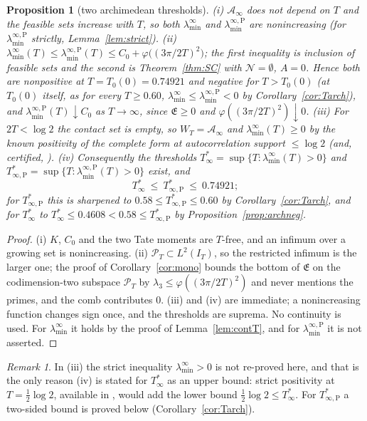 \documentclass[11pt]{amsart}
\newtheorem{proposition}[theorem]{Proposition}
\theoremstyle{definition}
\theoremstyle{remark}
\newtheorem{remark}[theorem]{Remark}
\newcommand{\PT}{\mathcal P_T}
\newcommand{\IT}{I_T}
\newcommand{\Lev}{\mathfrak E}
\newcommand{\Ainf}{\mathcal A_\infty}
\newcommand{\laminf}{\lambda^{\infty}_{\min}}
\newcommand{\laminfP}{\lambda^{\infty,\mathrm P}_{\min}}
\begin{document}
\begin{proposition}[two archimedean thresholds]\label{prop:arch}
\emph{(i)} $\Ainf$ does not depend on $T$ and the feasible sets increase with $T$, so both
$\laminf$ and $\laminfP$ are nonincreasing (for $\laminfP$ strictly, Lemma~\ref{lem:strict}).
\emph{(ii)} $\laminf(T)\le\laminfP(T)\le C_0+\varphi\big((3\pi/2T)^2\big)$; the first inequality is
inclusion of feasible sets and the second is Theorem~\ref{thm:SC} with $\mathcal N=\emptyset$,
$A=0$. Hence both are nonpositive at $T=T_0(0)=0.74921$ and negative for $T>T_0(0)$ (at $T_0(0)$
itself, as for every $T\ge0.60$, $\laminf\le\laminfP<0$ by Corollary~\ref{cor:Tarch}), and $\laminfP(T)\downarrow C_0$ as
$T\to\infty$, since $\Lev\ge0$ and $\varphi((3\pi/2T)^2)\downarrow0$.
\emph{(iii)} For $2T<\log2$ the contact set is empty, so $W_T=\Ainf$ and $\laminf(T)\ge0$ by the
known positivity of the complete form at autocorrelation support $\le\log2$
\textup{\cite{Yoshida1992,Bombieri2000}} (and, certified, \cite[Thm.~1.2]{Zhu2026}).
\emph{(iv)} Consequently the thresholds
$T^*_\infty=\sup\{T:\laminf(T)>0\}$ and $T^*_{\infty,\mathrm P}=\sup\{T:\laminfP(T)>0\}$ exist, and
\[
T^*_\infty\ \le\ T^*_{\infty,\mathrm P}\ \le\ 0.74921 ;
\]
for $T^*_{\infty,\mathrm P}$ this is sharpened to $0.58\le T^*_{\infty,\mathrm P}\le0.60$ by
Corollary~\ref{cor:Tarch}, and for $T^*_\infty$ to $T^*_\infty\le0.4608<0.58\le T^*_{\infty,\mathrm P}$ by
Proposition~\ref{prop:archneg}.
\end{proposition}
\begin{proof}
(i) $K$, $C_0$ and the two Tate moments are $T$-free, and an infimum over a growing set is
nonincreasing. (ii) $\PT\subset L^2(\IT)$, so the restricted infimum is the larger one; the proof of
Corollary~\ref{cor:mono} bounds the bottom of $\Lev$ on the codimension-two subspace $\PT$ by
$\lambda_3\le\varphi((3\pi/2T)^2)$ and never mentions the primes, and the comb contributes $0$.
(iii) and (iv) are immediate; a nonincreasing function changes sign once, and the thresholds are
suprema. No continuity is used. For $\laminf$ it holds by the proof of Lemma~\ref{lem:contT}, and for
$\laminfP$ it is not asserted.
\end{proof}
\begin{remark}
In (iii) the strict inequality $\laminf>0$ is not re-proved here, and that is the only reason
(iv) is stated for $T^*_\infty$ as an upper bound: strict positivity at $T=\frac12\log2$,
available in \cite{Yoshida1992}, would add the lower bound $\frac12\log2\le T^*_\infty$. For
$T^*_{\infty,\mathrm P}$ a two-sided bound is proved below (Corollary~\ref{cor:Tarch}).
\end{remark}
\end{document}

